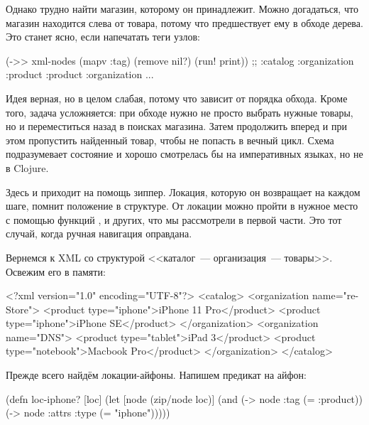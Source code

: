 Однако трудно найти магазин, которому он принадлежит. Можно догадаться, что
магазин находится слева от товара, потому что предшествует ему в обходе
дерева. Это станет ясно, если напечатать теги узлов:

\begin{english}
  \begin{clojure}
(->> xml-nodes (mapv :tag) (remove nil?) (run! print))
;; :catalog :organization :product :product :organization ...
  \end{clojure}
\end{english}

Идея верная, но в целом слабая, потому что зависит от порядка обхода. Кроме
того, задача усложняется: при обходе нужно не просто выбрать нужные товары, но и
переместиться назад в поисках магазина. Затем продолжить вперед и при этом
пропустить найденный товар, чтобы не попасть в вечный цикл. Схема подразумевает
состояние и хорошо смотрелась бы на императивных языках, но не в Clojure.

Здесь и приходит на помощь зиппер. Локация, которую он возвращает на каждом
шаге, помнит положение в структуре. От локации можно пройти в нужное место с
помощью функций ,  и других, что мы рассмотрели в первой
части. Это тот случай, когда ручная навигация оправдана.

Вернемся к XML со структурой <<каталог~--- организация~--- товары>>. Освежим его в
памяти:

\begin{english}
  \begin{xml}
<?xml version="1.0" encoding="UTF-8"?>
<catalog>
  <organization name="re-Store">
    <product type="iphone">iPhone 11 Pro</product>
    <product type="iphone">iPhone SE</product>
  </organization>
  <organization name="DNS">
    <product type="tablet">iPad 3</product>
    <product type="notebook">Macbook Pro</product>
  </organization>
</catalog>
  \end{xml}
\end{english}

Прежде всего найдём локации-айфоны. Напишем предикат на айфон:

\begin{english}
  \begin{clojure}
(defn loc-iphone? [loc]
  (let [node (zip/node loc)]
    (and (-> node :tag (= :product))
         (-> node :attrs :type (= "iphone")))))
  \end{clojure}
\end{english}

